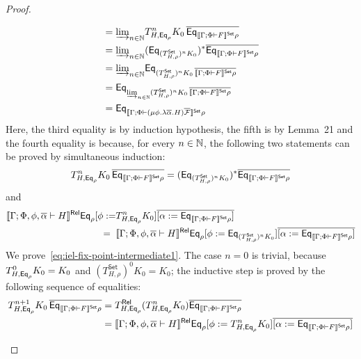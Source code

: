 \documentclass[acmsmall,review,anonymous]{acmart}
\theoremstyle{definition}
\newcommand{\F}{\mathcal{F}}
\newcommand{\set}{\mathsf{Set}}
\begin{document}
\begin{proof}
\begin{itemize}
\[\begin{split}
&= \colim{n \in \nat}{ T^n_{H, \Eq_{\rho}} K_0 \,\ol{\Eq_{\setsem{\Gamma;
    \Phi \vdash F}\rho}}}\\
&= \colim{n \in \nat}{(\Eq_{(T^\set_{H,\rho})^n K_0})^*
  \ol{\Eq_{\setsem{\Gamma; \Phi \vdash F}\rho}}}\\
&= \colim{n \in \nat}{\Eq_{(T^\set_{H,\rho})^n K_0 \,\ol{\setsem{\Gamma;
        \Phi \vdash F}\rho}}}\\ 
&= \Eq_{\colim{n \in \nat}{ (T^\set_{H,\rho})^n K_0\,
    \ol{\setsem{\Gamma; \Phi \vdash F}\rho}}}\\
&= \Eq_{\setsem{\Gamma; \Phi \vdash (\mu \phi.\lambda
      \ol{\alpha}. H)\ol{\F}}\rho}
\end{split}
\]
Here, the third equality is by induction hypothesis, the fifth is by
Lemma~21 and the fourth equality is because,
for every $n \in \mathbb{N}$, the following two statements can be proved by
simultaneous induction:
\begin{equation}\label{eq:iel-fix-point-intermediate1}
T^n_{H, \Eq_{\rho}} K_0\, \ol{\Eq_{\setsem{\Gamma; \Phi \vdash
      F}\rho}} = (\Eq_{(T^\set_{H, \rho})^n K_0})^*
\ol{\Eq_{\setsem{\Gamma; \Phi \vdash F}\rho}}
\end{equation}
and
\begin{equation}\label{eq:iel-fix-point-intermediate2}
\begin{split}
  \relsem{\Gamma; \Phi, \phi, \ol{\alpha} \vdash H}
\Eq_{\rho} [\phi := 
 & T^{n}_{H,\Eq_{\rho}} K_0] \overline{[\alpha :=
    \Eq_{\setsem{\Gamma; \Phi \vdash F}\rho}]} \\
=\;\; & \relsem{\Gamma; \Phi, \phi, \ol{\alpha} \vdash H} \Eq_{\rho} [\phi
  := \Eq_{(T^\set_{H,\rho})^n K_0}] \overline{[\alpha :=
    \Eq_{\setsem{\Gamma; \Phi \vdash F}\rho}]}
\end{split}
\end{equation}
We prove~\eqref{eq:iel-fix-point-intermediate1}.  The case $n=0$ is
trivial, because $T^0_{H,\mathsf{Eq}_{\rho}} K_0 = K_0$ and
$(T^\set_{H,\rho})^0 K_0 = K_0$; the inductive step is
proved by the following sequence of equalities:
\[
\begin{split}
T^{n+1}_{H,\Eq_{\rho}} K_0\, \overline{\Eq_{\setsem{\Gamma; \Phi \vdash F}\rho}}
&= T^\rel_{H,\Eq_{\rho}} (T^{n}_{H,\Eq_{\rho}} K_0)
\overline{\Eq_{\setsem{\Gamma; \Phi \vdash F}\rho}} \\ 
&= \relsem{\Gamma; \Phi, \phi, \ol{\alpha} \vdash H} \Eq_{\rho} [\phi
  := T^{n}_{H, \Eq_{\rho}} K_0] \overline{[\alpha :=
    \Eq_{\setsem{\Gamma; \Phi \vdash F}\rho}]} \\ 

\end{split}\]
\end{itemize}
\end{proof}
\end{document}
